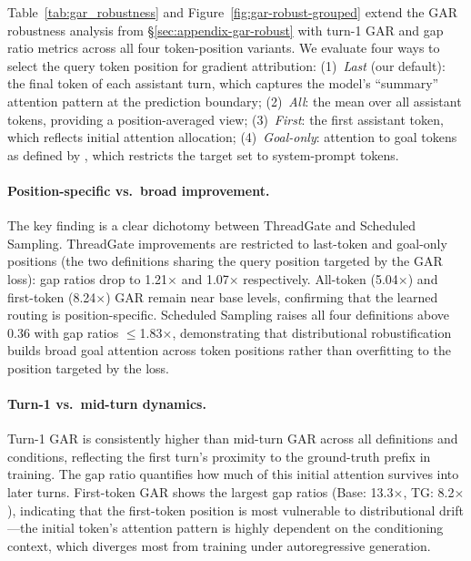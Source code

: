Table~\ref{tab:gar_robustness} and Figure~\ref{fig:gar-robust-grouped} extend the GAR robustness analysis from \S\ref{sec:appendix-gar-robust} with turn-1 GAR and gap ratio metrics across all four token-position variants. We evaluate four ways to select the query token position for gradient attribution: (1)~\textit{Last} (our default): the final token of each assistant turn, which captures the model's ``summary'' attention pattern at the prediction boundary; (2)~\textit{All}: the mean over all assistant tokens, providing a position-averaged view; (3)~\textit{First}: the first assistant token, which reflects initial attention allocation; (4)~\textit{Goal-only}: attention to goal tokens as defined by \citet{dongre2026attention}, which restricts the target set to system-prompt tokens.

\paragraph{Position-specific vs.\ broad improvement.} The key finding is a clear dichotomy between ThreadGate and Scheduled Sampling. ThreadGate improvements are restricted to last-token and goal-only positions (the two definitions sharing the query position targeted by the GAR loss): gap ratios drop to 1.21$\times$ and 1.07$\times$ respectively. All-token (5.04$\times$) and first-token (8.24$\times$) GAR remain near base levels, confirming that the learned routing is position-specific. Scheduled Sampling raises all four definitions above 0.36 with gap ratios $\leq$1.83$\times$, demonstrating that distributional robustification builds broad goal attention across token positions rather than overfitting to the position targeted by the loss.

\paragraph{Turn-1 vs.\ mid-turn dynamics.} Turn-1 GAR is consistently higher than mid-turn GAR across all definitions and conditions, reflecting the first turn's proximity to the ground-truth prefix in training. The gap ratio quantifies how much of this initial attention survives into later turns. First-token GAR shows the largest gap ratios (Base: 13.3$\times$, TG: 8.2$\times$), indicating that the first-token position is most vulnerable to distributional drift---the initial token's attention pattern is highly dependent on the conditioning context, which diverges most from training under autoregressive generation.

